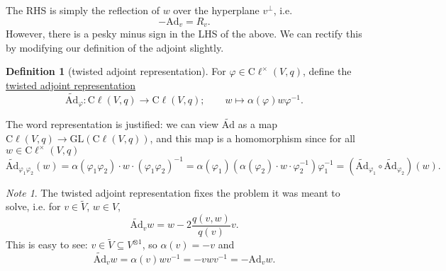 \documentclass[a4paper,10pt]{scrreprt}
\newcommand{\defn}[1]{\ul{#1}}
\newcommand{\cliff}{\mathrm{C}\ell}
\newcommand{\Ad}{\mathrm{Ad}}
\newcommand{\tAd}{\widetilde{\mathrm{Ad}}}
\newcommand{\GL}{\mathrm{GL}}
\theoremstyle{definition}
\newtheorem{definition}{Definition}[section]
\theoremstyle{plain}
\theoremstyle{remark}
\newtheorem{note}{Note}[section]
\begin{document}
The RHS is simply the reflection of $w$ over the hyperplane $v^{\perp}$, i.e.
\begin{equation*}
  -\Ad_{v} = R_{v}.
\end{equation*}
However, there is a pesky minus sign in the LHS of the above. We can rectify this by modifying our definition of the adjoint slightly.

\begin{definition}[twisted adjoint representation]
  \label{def:twistedadjointrepresentation}
  For $\varphi \in \cliff^{\times}(V, q)$, define the \defn{twisted adjoint representation}
  \begin{equation*}
    \tAd_{\varphi}\colon \cliff(V, q) \to \cliff(V, q);\qquad w \mapsto \alpha(\varphi)w\varphi^{-1}.
  \end{equation*}

  The word representation is justified: we can view $\tAd$ as a map $\cliff(V, q) \to \GL(\cliff(V, q))$, and this map is a homomorphism since for all $w \in \cliff^{\times}(V, q)$
  \begin{equation*}
    \tAd_{\varphi_{1}\varphi_{2}}(w) = \alpha(\varphi_{1} \varphi_{2}) \cdot w \cdot (\varphi_{1} \varphi_{2})^{-1} = \alpha(\varphi_{1}) \left( \alpha(\varphi_{2}) \cdot w \cdot \varphi_{2}^{-1} \right) \varphi_{1}^{-1} = (\tAd_{\varphi_{1}} \circ \tAd_{\varphi_{2}})(w).
  \end{equation*}
\end{definition}

\begin{note}
  The twisted adjoint representation fixes the problem it was meant to solve, i.e. for $v \in \tilde{V}$, $w \in V$,
  \begin{equation*}
    \tAd_{v}w = w - 2\frac{q(v, w)}{q(v)}v.
  \end{equation*}
  This is easy to see: $v \in \tilde{V} \subseteq V^{\otimes 1}$, so $\alpha(v) = -v$ and
  \begin{equation*}
    \tAd_{v}w = \alpha(v) w v^{-1} = -v w v^{-1} = -\Ad_{v} w.
  \end{equation*}
\end{note}
\end{document}
